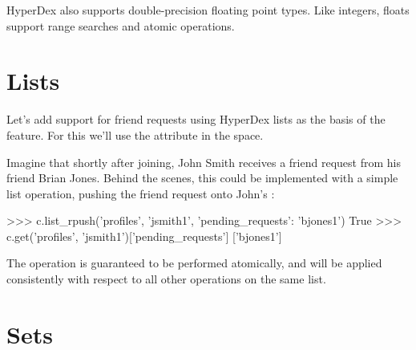 HyperDex also supports double-precision floating point types.  Like integers,
floats support range searches and atomic operations.

\section{Lists}
\label{sec:data-types:lists}

Let's add support for friend requests using HyperDex lists as the basis of the
feature.  For this we'll use the  attribute in the
 space.
 
Imagine that shortly after joining, John Smith receives a friend request from
his friend Brian Jones.  Behind the scenes, this could be implemented with a
simple list operation, pushing the friend request onto John's
:

\begin{pythoncode}
>>> c.list_rpush('profiles', 'jsmith1', {'pending_requests': 'bjones1'})
True
>>> c.get('profiles', 'jsmith1')['pending_requests']
['bjones1']
\end{pythoncode}

The operation  is guaranteed to be performed atomically, and
will be applied consistently with respect to all other operations on the same
list.

\begin{comment} %
Note that lists provide both an lpush and rpush operation. The former adds the
new element at the head of the list, while the latter adds at the tail. They
also provide lpop operation for taking an element off the head of the list.
Coupled together, these operations provide a comprehensive list datatype that
can be used to implement fault-tolerant lists of all kinds. For instance, one
can implement work queues and generalized producer-consumer patterns on top of
HyperDex lists in a pretty straightforward fashion. In this case, producers
would push at one end of the list (the tail, with an rpush) and consumers would
pop from the other (the head, with a pop). Since the operations are atomic, no
additional synchronization would be necessary, enabling a high-performance
implementation.
\end{comment}

\section{Sets}
\label{sec:data-types:sets}

